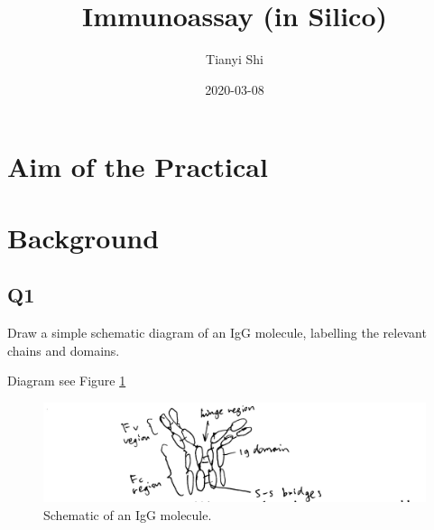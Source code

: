 \documentclass[
]{article}
\title{Immunoassay (in Silico)}
\author{Tianyi Shi}
\date{2020-03-08}
\begin{document}
\maketitle

{
\setcounter{tocdepth}{2}
\tableofcontents
}
\hypertarget{aim-of-the-practical}{%
\section{Aim of the Practical}\label{aim-of-the-practical}}

\hypertarget{background}{%
\section{Background}\label{background}}

\hypertarget{q1}{%
\subsection*{Q1}\label{q1}}

Draw a simple schematic diagram of an IgG molecule, labelling the relevant chains and domains.

Diagram see Figure \ref{fig:ab-schematic}

\begin{figure}
\includegraphics[width=1\linewidth]{../img/ab-schematic} \caption{Schematic of an IgG molecule.}\label{fig:ab-schematic}
\end{figure}
\end{document}
